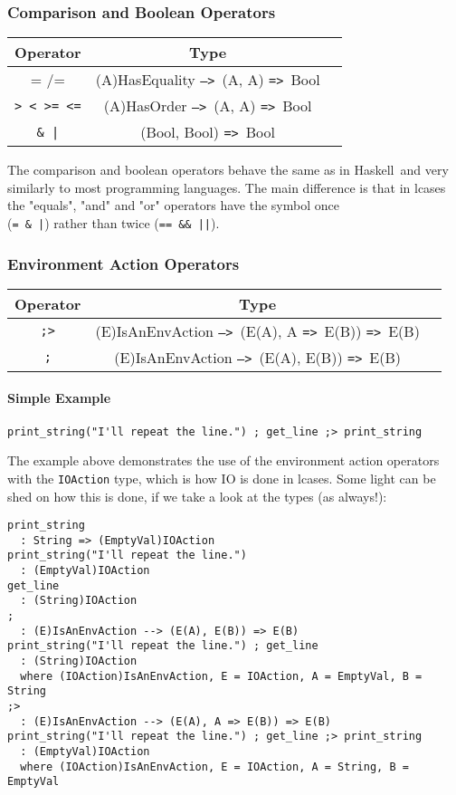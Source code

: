 \documentclass{article}
\def\H{Haskell}
\def\ra{\texttt{=>}\ }
\def\Ra{\texttt{-->}\ }
\begin{document}
\subsubsection{Comparison and Boolean Operators}

\begin{center}
\begin{tabular}{ |c|c|c| } 
\hline
Operator & Type \\ 
\hline
\hline
= /= & (A)HasEquality \Ra (A, A) \ra Bool \\
\hline
\texttt{> < >= <=} & (A)HasOrder \Ra (A, A) \ra Bool \\
\hline
\texttt{\& |} & (Bool, Bool) \ra Bool \\
\hline
\end{tabular}
\end{center}
The comparison and boolean operators behave the same as in \H\ and very
similarly to most programming languages. The main difference is that in lcases
the "equals", "and" and "or" operators have the symbol once \\(\texttt{= \& |})
rather than twice (\texttt{== \&\& ||}).

\subsubsection{Environment Action Operators}

\begin{center}
\begin{tabular}{ |c|c|c| } 
\hline
Operator & Type \\ 
\hline
\hline
\texttt{;>} & (E)IsAnEnvAction \Ra (E(A), A \ra E(B)) \ra E(B) \\
\hline
\texttt{;} & (E)IsAnEnvAction \Ra (E(A), E(B)) \ra E(B) \\
\hline
\end{tabular}
\end{center}

\paragraph{Simple Example}
\begin{verbatim}
print_string("I'll repeat the line.") ; get_line ;> print_string
\end{verbatim}
The example above demonstrates the use of the environment action operators with
the \texttt{IOAction} type, which is how IO is done in lcases. Some light can
be shed on how this is done, if we take a look at the types (as always!):
\begin{verbatim}
print_string
  : String => (EmptyVal)IOAction
print_string("I'll repeat the line.")
  : (EmptyVal)IOAction
get_line
  : (String)IOAction
; 
  : (E)IsAnEnvAction --> (E(A), E(B)) => E(B) 
print_string("I'll repeat the line.") ; get_line
  : (String)IOAction
  where (IOAction)IsAnEnvAction, E = IOAction, A = EmptyVal, B = String
;>
  : (E)IsAnEnvAction --> (E(A), A => E(B)) => E(B) 
print_string("I'll repeat the line.") ; get_line ;> print_string
  : (EmptyVal)IOAction
  where (IOAction)IsAnEnvAction, E = IOAction, A = String, B = EmptyVal
\end{verbatim}
\end{document}
